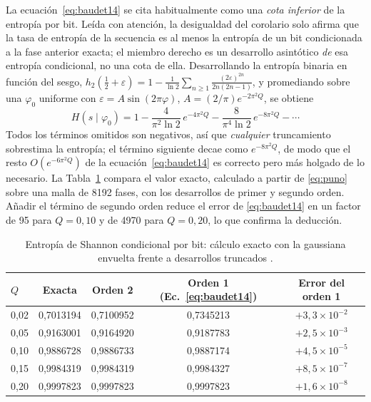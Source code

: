 La ecuación~\eqref{eq:baudet14} se cita habitualmente como una \emph{cota
inferior} de la entropía por bit. Leída con atención, la desigualdad del
corolario solo afirma que la tasa de entropía de la secuencia es al menos
la entropía de un bit condicionada a la fase anterior exacta; el miembro
derecho es un desarrollo asintótico \emph{de} esa entropía condicional, no
una cota de ella. Desarrollando la entropía binaria en función del sesgo,
$h_2(\tfrac12+\varepsilon) = 1 - \tfrac{1}{\ln 2}\sum_{n\ge1}
\tfrac{(2\varepsilon)^{2n}}{2n(2n-1)}$, y promediando sobre una $\varphi_0$
uniforme con $\varepsilon = A\sin(2\pi\varphi)$,
$A = (2/\pi)e^{-2\pi^2 Q}$, se obtiene
\begin{equation}
  H(s\mid\varphi_0) = 1 - \frac{4}{\pi^2\ln 2}\,e^{-4\pi^2 Q}
                        - \frac{8}{\pi^4\ln 2}\,e^{-8\pi^2 Q} - \cdots
  \label{eq:orden2}
\end{equation}
Todos los términos omitidos son negativos, así que \emph{cualquier}
truncamiento sobrestima la entropía; el término siguiente decae como
$e^{-8\pi^2 Q}$, de modo que el resto $O(e^{-6\pi^2 Q})$ de la
ecuación~\eqref{eq:baudet14} es correcto pero más holgado de lo
necesario. La Tabla~\ref{tab:exact}
compara el valor exacto, calculado a partir de \eqref{eq:puno} sobre una
malla de 8192 fases, con los desarrollos de primer y segundo orden. Añadir
el término de segundo orden reduce el error de \eqref{eq:baudet14} en un
factor de 95 para $Q=0{,}10$ y de 4970 para $Q=0{,}20$, lo que confirma la
deducción.

\begin{table}[htbp]
\centering
\caption{Entropía de Shannon condicional por bit: cálculo exacto con la
gaussiana envuelta frente a desarrollos truncados \simu{}.}
\label{tab:exact}
\begin{tabular}{@{}lcccc@{}}
\toprule
$Q$ & Exacta & Orden 2 & Orden 1 (Ec.~\ref{eq:baudet14}) & Error del orden 1 \\
\midrule
0,02 & 0,7013194 & 0,7100952 & 0,7345213 & $+3{,}3\times10^{-2}$ \\
0,05 & 0,9163001 & 0,9164920 & 0,9187783 & $+2{,}5\times10^{-3}$ \\
0,10 & 0,9886728 & 0,9886733 & 0,9887174 & $+4{,}5\times10^{-5}$ \\
0,15 & 0,9984319 & 0,9984319 & 0,9984327 & $+8{,}5\times10^{-7}$ \\
0,20 & 0,9997823 & 0,9997823 & 0,9997823 & $+1{,}6\times10^{-8}$ \\
\bottomrule
\end{tabular}
\end{table}

